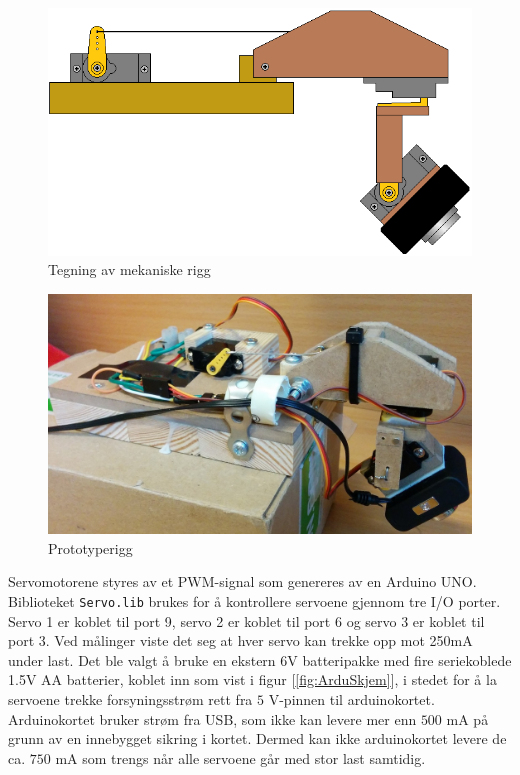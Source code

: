 \begin{figure}[h!]
	\centering
	\includegraphics[scale=0.5]{img/RIGG_sattsammen.png}
	\caption{Tegning av mekaniske rigg}
	\label{fig:RiggTegn}
\end{figure}

\begin{figure}[h!]
	\centering
	\includegraphics[scale=0.25]{img/Rigg_Bilde.jpg}
	\caption{Prototyperigg}
	\label{fig:RiggBilde}
\end{figure}

Servomotorene styres av et PWM-signal som genereres av en Arduino UNO. Biblioteket \texttt{Servo.lib} brukes for å kontrollere servoene gjennom tre I/O porter. Servo 1 er koblet til port 9, servo 2 er koblet til port 6 og servo 3 er koblet til port 3. Ved målinger viste det seg at hver servo kan trekke opp mot 250mA under last. Det ble valgt å bruke en ekstern 6V batteripakke med fire seriekoblede 1.5V AA batterier, koblet inn som vist i figur [\ref{fig:ArduSkjem}], i stedet for å la servoene trekke forsyningsstrøm rett fra $5$ V-pinnen til arduinokortet. Arduinokortet bruker strøm fra USB, som ikke kan levere mer enn $500$ mA på grunn av en innebygget sikring i kortet. Dermed kan ikke arduinokortet levere de ca. $750$ mA som trengs når alle servoene går med stor last samtidig.

